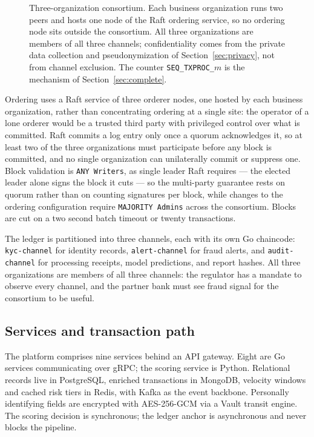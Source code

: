 \documentclass[conference]{IEEEtran}
\begin{document}
\begin{figure}[t]
\caption{Three-organization consortium. Each business organization runs two
peers and hosts one node of the Raft ordering service, so no ordering node sits
outside the consortium. All
three organizations are members of all three channels; confidentiality comes
from the private data collection and pseudonymization of
Section~\ref{sec:privacy}, not from channel exclusion. The counter
\texttt{SEQ\_TXPROC\_$m$} is the mechanism of Section~\ref{sec:complete}.}
\label{fig:network}
\end{figure}

Ordering uses a Raft service of three orderer nodes, one hosted by each business
organization, rather than concentrating ordering at a single site: the operator
of a lone orderer would be a trusted third party with privileged control over
what is committed. Raft commits a log entry only once a quorum acknowledges it,
so at least two of the three organizations must participate before any block is
committed, and no single organization can unilaterally commit or suppress one.
Block validation is \texttt{ANY Writers}, as single leader Raft requires --- the
elected leader alone signs the block it cuts --- so the multi-party guarantee
rests on quorum rather than on counting signatures per block, while changes to
the ordering configuration require \texttt{MAJORITY Admins} across the
consortium. Blocks are cut on a two second batch timeout or twenty
transactions.

The ledger is partitioned into three channels, each with its own Go chaincode:
\texttt{kyc-channel} for identity records, \texttt{alert-channel} for fraud
alerts, and \texttt{audit-channel} for processing receipts, model predictions,
and report hashes. All three organizations are members of all three channels:
the regulator has a mandate to observe every channel, and the partner bank must
see fraud signal for the consortium to be useful.

\subsection{Services and transaction path}

The platform comprises nine services behind an API gateway. Eight are Go
services communicating over gRPC; the scoring service is Python. Relational
records live in PostgreSQL, enriched transactions in MongoDB, velocity windows
and cached risk tiers in Redis, with Kafka as the event backbone. Personally
identifying fields are encrypted with AES-256-GCM via a Vault transit engine.
The scoring decision is synchronous; the ledger anchor is asynchronous and
never blocks the pipeline.
\end{document}
